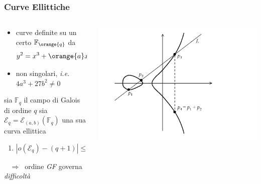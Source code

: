 \begin{frame}
	\frametitle{Curve Ellittiche}

\begin{columns}
	\begin{column}{.65\textwidth}

		\begin{itemize}
			\item curve definite su un certo $\mathbb{F}_\orange{q}$ da 
				$$y^2=x^3+\orange{a}x+\orange{b}$$
			\item non singolari, \textit{i.e.} $4a^3+27b^2\neq 0$
		\end{itemize}

		\begin{theorem}[Hasse]
			 sia $\mathbb{F}_q$ il campo di Galois di ordine $q$ 
			 \newline sia $\mathcal{E}_q=\mathcal{E}_{(a,b)}(\mathbb{F}_q)$ una sua curva ellittica 
			\vspace*{4pt}
			\begin{enumerate}
				\item $|o(\mathcal{E}_q)-(q+1)|\leq2\sqrt q$
			\end{enumerate}	
		\end{theorem} 
		$\;\;\;\Rightarrow\;\;${\color{blue}ordine} \textit{GF} governa \textit{difficoltà}

	\end{column}

	\begin{column}{.4\textwidth}
		\includegraphics[height = 5 cm]{images/eca.png}
	\end{column}
\end{columns}

\end{frame}
